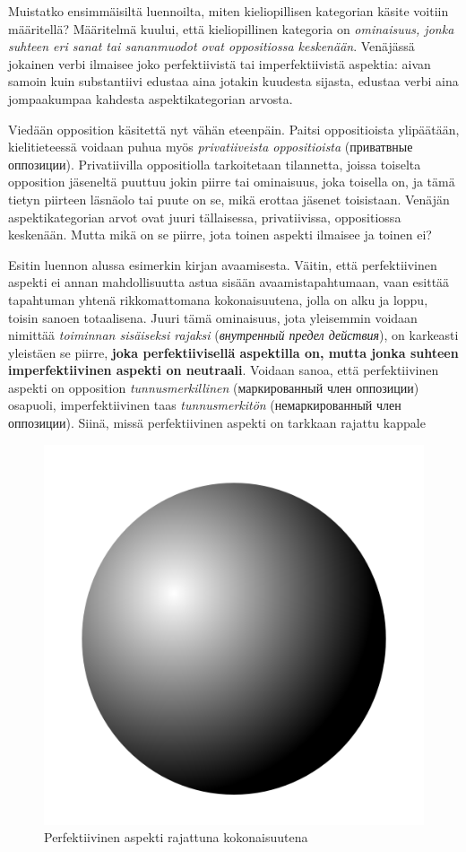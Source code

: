 \documentclass[]{scrreprt}
\begin{document}
Muistatko ensimmäisiltä luennoilta, miten kieliopillisen kategorian
käsite voitiin määritellä? Määritelmä kuului, että kieliopillinen
kategoria on \emph{ominaisuus, jonka suhteen eri sanat tai sananmuodot
ovat oppositiossa keskenään}. Venäjässä jokainen verbi ilmaisee joko
perfektiivistä tai imperfektiivistä aspektia: aivan samoin kuin
substantiivi edustaa aina jotakin kuudesta sijasta, edustaa verbi aina
jompaakumpaa kahdesta aspektikategorian arvosta.

Viedään opposition käsitettä nyt vähän eteenpäin. Paitsi oppositioista
ylipäätään, kielitieteessä voidaan puhua myös \emph{privatiiveista
oppositioista} (приватвные оппозиции). Privatiivilla oppositiolla
tarkoitetaan tilannetta, joissa toiselta opposition jäseneltä puuttuu
jokin piirre tai ominaisuus, joka toisella on, ja tämä tietyn piirteen
läsnäolo tai puute on se, mikä erottaa jäsenet toisistaan. Venäjän
aspektikategorian arvot ovat juuri tällaisessa, privatiivissa,
oppositiossa keskenään. Mutta mikä on se piirre, jota toinen aspekti
ilmaisee ja toinen ei?

Esitin luennon alussa esimerkin kirjan avaamisesta. Väitin, että
perfektiivinen aspekti ei annan mahdollisuutta astua sisään
avaamistapahtumaan, vaan esittää tapahtuman yhtenä rikkomattomana
kokonaisuutena, jolla on alku ja loppu, toisin sanoen totaalisena. Juuri
tämä ominaisuus, jota yleisemmin voidaan nimittää \emph{toiminnan
sisäiseksi rajaksi} (\emph{внутренный предел действия}), on karkeasti
yleistäen se piirre, \textbf{joka perfektiivisellä aspektilla on, mutta
jonka suhteen imperfektiivinen aspekti on neutraali}. Voidaan sanoa,
että perfektiivinen aspekti on opposition \emph{tunnusmerkillinen}
(маркированный член оппозиции) osapuoli, imperfektiivinen taas
\emph{tunnusmerkitön} (немаркированный член оппозиции). Siinä, missä
perfektiivinen aspekti on tarkkaan rajattu kappale

\FloatBarrier
\begin{figure}[htbp]
\centering
\includegraphics[width=.3\textwidth]{../figure/sphere.png}
\caption{Perfektiivinen aspekti rajattuna kokonaisuutena}
\end{figure}
\FloatBarrier
\end{document}

